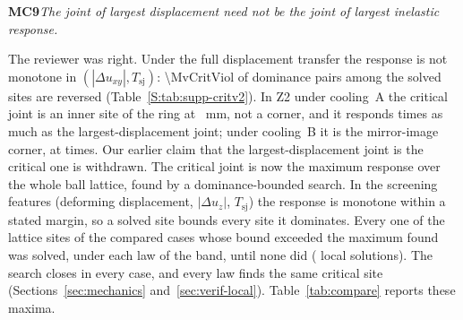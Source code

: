 \documentclass[10pt]{article}
\newcommand{\grp}[1]{\num[group-separator={,},group-minimum-digits=4]{#1}}
\newcommand{\rc}[2]{\par\medskip\noindent\textbf{#1}\enspace\emph{#2}\par\smallskip\noindent}
\begin{document}
\rc{MC9}{The joint of largest displacement need not be the joint of largest inelastic response.}
The reviewer was right. Under the full displacement transfer the response is not monotone in
$(|\Delta u_{xy}|, T_{\mathrm{sj}})$: \grp{\MvCritViol} of \MvCritPairs{} dominance pairs among the
solved sites are reversed (Table~\ref{S:tab:supp-critv2}). In Z2 under cooling~A the critical joint
is an inner site of the ring at \MvCritSiteAZtwo~mm, not a corner, and it responds \MvCritRatioAZtwo{}
times as much as the largest-displacement joint; under cooling~B it is the mirror-image corner, at
\MvCritRatioBZtwo{} times. Our earlier claim that the largest-displacement joint is the critical one
is withdrawn. The critical joint is now the maximum response over the whole ball lattice, found by a
dominance-bounded search. In the screening features (deforming displacement, $|\Delta u_z|$,
$T_{\mathrm{sj}}$) the response is monotone within a stated margin, so a solved site bounds every site
it dominates. Every one of the \MvCritLattice{} lattice sites of the \MvCritCasesWord{} compared cases
whose bound exceeded the maximum found was solved, under each law of the band, until none did
(\MvCritSolvedAll{} local solutions). The search closes in every case, and every law finds the same
critical site (Sections~\ref{sec:mechanics} and~\ref{sec:verif-local}). Table~\ref{tab:compare}
reports these maxima.
\end{document}
